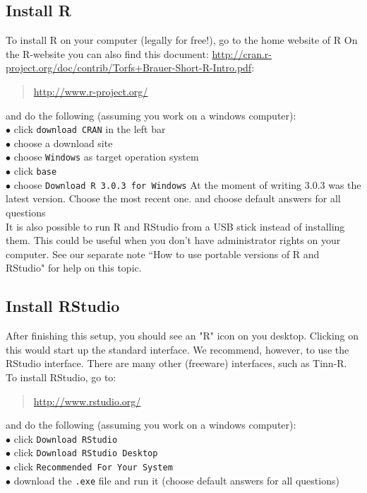 \documentclass[a4paper,11pt,twocolumn,tablecaptionabove]{scrartcl} %
\makeatletter
\let\SF@@footnote\footnote
\def\footnote{\ifx\protect\@typeset@protect
 \expandafter\SF@@footnote
 \else
 \expandafter\SF@gobble@opt
 \fi
}
\edef\SF@gobble@opt{\noexpand\protect
 \expandafter\noexpand\csname SF@gobble@opt \endcsname}
\makeatother
\begin{document}
\subsection{Install R}

To install R on your computer (legally for free!), go to the home
website of R\footnote{On the R-website you can also find this document: \url{http://cran.r-project.org/doc/contrib/Torfs+Brauer-Short-R-Intro.pdf}}:
\begin{quote}
  \url{http://www.r-project.org/}
\end{quote}
and do the following (assuming you work on a windows computer):\\
\noindent $\bullet$ click \texttt{download CRAN}  in the left bar\\
\noindent $\bullet$ choose a download site\\
\noindent $\bullet$ choose \texttt{Windows} as target operation system\\
\noindent $\bullet$ click \texttt{base}\\
\noindent $\bullet$ choose \texttt{Download R 3.0.3 for Windows} \footnote{At the moment of writing 3.0.3 was the latest version. Choose the most recent one.} and choose default answers for all questions\\

It is also possible to run R and RStudio from a USB stick instead of installing them. This could be useful when you don't have administrator rights on your computer. See our separate note ``How to use portable versions of R and RStudio" for help on this topic.

\subsection{Install RStudio}

After finishing this setup, you should see an "R" icon on you
desktop. Clicking on this would start up the standard interface.
We recommend, however, to use the RStudio interface.
\footnote{There are many other (freeware) interfaces, such as Tinn-R.}
To install RStudio, go to: 
\begin{quote}
  \url{http://www.rstudio.org/}
\end{quote}
and do the following (assuming you work on a windows computer):\\
\noindent $\bullet$ click \texttt{Download RStudio}\\
\noindent $\bullet$ click \texttt{Download RStudio Desktop}\\
\noindent $\bullet$ click \texttt{Recommended For Your System}\\
\noindent $\bullet$ download the \texttt{.exe} file and run it 
(choose default answers for all questions)
\end{document}
